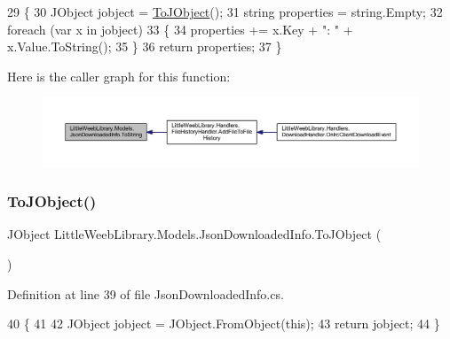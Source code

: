\begin{DoxyCode}
29         \{
30             JObject jobject = \mbox{\hyperlink{class_little_weeb_library_1_1_models_1_1_json_downloaded_info_a9d0248a04fbe0fcc8b6c393ef7f6680e}{ToJObject}}();
31             \textcolor{keywordtype}{string} properties = \textcolor{keywordtype}{string}.Empty;
32             \textcolor{keywordflow}{foreach} (var x \textcolor{keywordflow}{in} jobject)
33             \{
34                 properties += x.Key + \textcolor{stringliteral}{": "} + x.Value.ToString();
35             \}
36             \textcolor{keywordflow}{return} properties;
37         \}
\end{DoxyCode}
Here is the caller graph for this function\+:\nopagebreak
\begin{figure}[H]
\begin{center}
\leavevmode
\includegraphics[width=350pt]{class_little_weeb_library_1_1_models_1_1_json_downloaded_info_a1ffa120527f102b7bf96a4c0a2d9e298_icgraph}
\end{center}
\end{figure}
\mbox{\label{class_little_weeb_library_1_1_models_1_1_json_downloaded_info_a9d0248a04fbe0fcc8b6c393ef7f6680e}} 
\subsubsection{\texorpdfstring{To\+J\+Object()}{ToJObject()}}
{\footnotesize\ttfamily J\+Object Little\+Weeb\+Library.\+Models.\+Json\+Downloaded\+Info.\+To\+J\+Object (\begin{DoxyParamCaption}{ }\end{DoxyParamCaption})}



Definition at line 39 of file Json\+Downloaded\+Info.\+cs.


\begin{DoxyCode}
40         \{
41 
42             JObject jobject = JObject.FromObject(\textcolor{keyword}{this});
43             \textcolor{keywordflow}{return} jobject;
44         \}
\end{DoxyCode}


